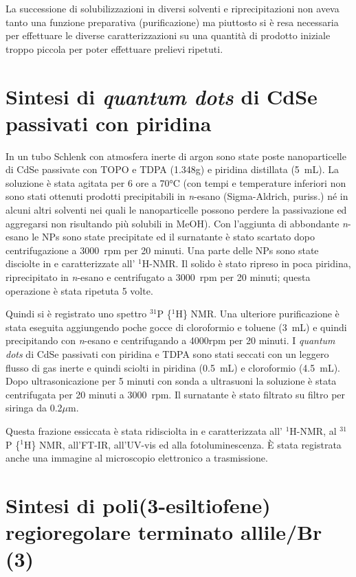La successione di solubilizzazioni in diversi solventi e riprecipitazioni non aveva tanto una funzione preparativa (purificazione) ma piuttosto si è resa necessaria per effettuare le diverse caratterizzazioni su una quantità di prodotto iniziale troppo piccola per poter effettuare prelievi ripetuti.


\section{Sintesi di \emph{quantum dots} di CdSe passivati con piridina}
\label{sec:CdSe-Py}
In un tubo Schlenk con atmosfera inerte di argon sono state poste nanoparticelle di CdSe passivate con TOPO e TDPA (1.348g) e piridina distillata (5~mL). La soluzione è stata agitata per 6 ore a 70°C (con tempi e temperature inferiori non sono stati ottenuti prodotti precipitabili in {\itshape n}-esano (Sigma-Aldrich, puriss.) né in alcuni altri solventi nei quali le nanoparticelle possono perdere la passivazione ed aggregarsi non risultando più solubili in MeOH). Con l'aggiunta di abbondante {\itshape n}-esano le NPs sono state precipitate ed il surnatante è stato scartato dopo centrifugazione a 3000~rpm per 20 minuti. Una parte delle NPs sono state disciolte in  e caratterizzate all' $^1$H-NMR\@. Il solido è stato ripreso in poca piridina, riprecipitato in {\itshape n}-esano e centrifugato a 3000~rpm per 20 minuti; questa operazione è stata ripetuta 5 volte. 

Quindi si è registrato uno spettro $^{31}$P \{$^1$H\} NMR\@. Una ulteriore purificazione è stata eseguita aggiungendo poche gocce di cloroformio e toluene (3~mL) e quindi precipitando con {\itshape n}-esano e centrifugando a 4000rpm per 20 minuti. 
I \emph{quantum dots} di CdSe passivati con piridina e TDPA sono stati seccati con un leggero flusso di gas inerte e quindi sciolti in piridina (0.5~mL) e cloroformio (4.5~mL). Dopo ultrasonicazione per 5 minuti con sonda a ultrasuoni la soluzione è stata centrifugata per 20 minuti a 3000~rpm. Il surnatante è stato filtrato su filtro per siringa da 0.2$\mu$m. 

Questa frazione essiccata è stata ridisciolta in  e caratterizzata all' $^1$H-NMR, al $^{31}$P \{$^1$H\} NMR, all'FT-IR, all'UV-vis ed alla fotoluminescenza. È stata registrata anche una immagine al microscopio elettronico a trasmissione.
\section{Sintesi di poli(3-esiltiofene) regioregolare terminato allile/Br (3)}

